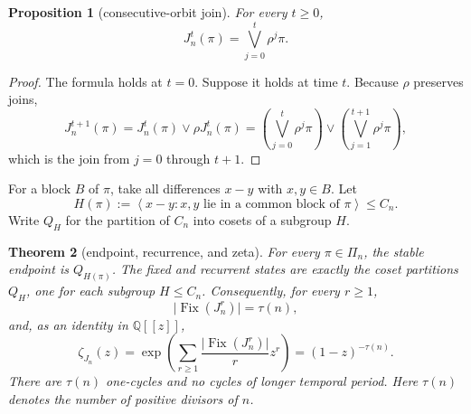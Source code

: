 \documentclass[11pt,a4paper]{amsart}
\newtheorem{theorem}{Theorem}[section]
\newtheorem{proposition}[theorem]{Proposition}
\theoremstyle{definition}
\theoremstyle{remark}
\newcommand{\Cn}{C_n}
\newcommand{\Pin}{\Pi_n}
\newcommand{\Fix}{\operatorname{Fix}}
\newcommand{\card}[1]{\lvert #1\rvert}
\newcommand{\Q}{\mathbb Q}
\begin{document}
\begin{proposition}[consecutive-orbit join]\label{prop:iterate}
For every $t\geq0$,
\begin{equation}\label{eq:iterate}
          \boxed{J_n^t(\pi)=\bigvee_{j=0}^{t}\rho^j\pi.}
\end{equation}
\end{proposition}

\begin{proof}
The formula holds at $t=0$.  Suppose it holds at time $t$.  Because $\rho$
preserves joins,
\[
 J_n^{t+1}(\pi)
 =J_n^t(\pi)\vee\rho J_n^t(\pi)
 =\left(\bigvee_{j=0}^{t}\rho^j\pi\right)
  \vee\left(\bigvee_{j=1}^{t+1}\rho^j\pi\right),
\]
which is the join from $j=0$ through $t+1$.
\end{proof}

For a block $B$ of $\pi$, take all differences $x-y$ with $x,y\in B$.
Let
\begin{equation}\label{eq:subgroup}
 H(\pi):=\left\langle x-y:
     x,y\text{ lie in a common block of }\pi\right\rangle\leq\Cn.
\end{equation}
Write $Q_H$ for the partition of $\Cn$ into cosets of a subgroup $H$.

\begin{theorem}[endpoint, recurrence, and zeta]\label{thm:endpoint}
For every $\pi\in\Pin$, the stable endpoint is $Q_{H(\pi)}$.  The fixed and
recurrent states are exactly the coset partitions $Q_H$, one for each
subgroup $H\leq\Cn$.  Consequently, for every $r\geq1$,
\begin{equation}\label{eq:fixed}
 \card{\Fix(J_n^r)}=\tau(n),
\end{equation}
and, as an identity in $\Q[[z]]$,
\begin{equation}\label{eq:zeta}
 \boxed{\displaystyle \zeta_{J_n}(z)
 =\exp\left(\sum_{r\geq1}
   \frac{\card{\Fix(J_n^r)}}{r}z^r\right)
 =(1-z)^{-\tau(n)}.}
\end{equation}
There are $\tau(n)$ one-cycles and no cycles of longer temporal period.
Here $\tau(n)$ denotes the number of positive divisors of $n$.
\end{theorem}
\end{document}
